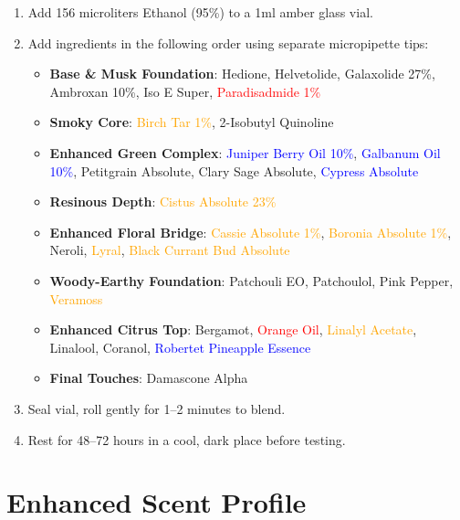 \documentclass{article}
\begin{document}
\begin{enumerate}
    \item Add 156 microliters Ethanol (95\%) to a 1ml amber glass vial.
    
    \item Add ingredients in the following order using separate micropipette tips:
    \begin{itemize}
        \item \textbf{Base \& Musk Foundation}: Hedione, Helvetolide, Galaxolide 27\%, Ambroxan 10\%, Iso E Super, \textcolor{red}{Paradisadmide 1\%}
        \item \textbf{Smoky Core}: \textcolor{orange}{Birch Tar 1\%}, 2-Isobutyl Quinoline
        \item \textbf{Enhanced Green Complex}: \textcolor{blue}{Juniper Berry Oil 10\%}, \textcolor{blue}{Galbanum Oil 10\%}, Petitgrain Absolute, Clary Sage Absolute, \textcolor{blue}{Cypress Absolute}
        \item \textbf{Resinous Depth}: \textcolor{orange}{Cistus Absolute 23\%}
        \item \textbf{Enhanced Floral Bridge}: \textcolor{orange}{Cassie Absolute 1\%}, \textcolor{orange}{Boronia Absolute 1\%}, Neroli, \textcolor{orange}{Lyral}, \textcolor{orange}{Black Currant Bud Absolute}
        \item \textbf{Woody-Earthy Foundation}: Patchouli EO, Patchoulol, Pink Pepper, \textcolor{orange}{Veramoss}
        \item \textbf{Enhanced Citrus Top}: Bergamot, \textcolor{red}{Orange Oil}, \textcolor{orange}{Linalyl Acetate}, Linalool, Coranol, \textcolor{blue}{Robertet Pineapple Essence}
        \item \textbf{Final Touches}: Damascone Alpha
    \end{itemize}
    
    \item Seal vial, roll gently for 1--2 minutes to blend.
    
    \item Rest for 48--72 hours in a cool, dark place before testing.
\end{enumerate}

\section{Enhanced Scent Profile}
\end{document}
